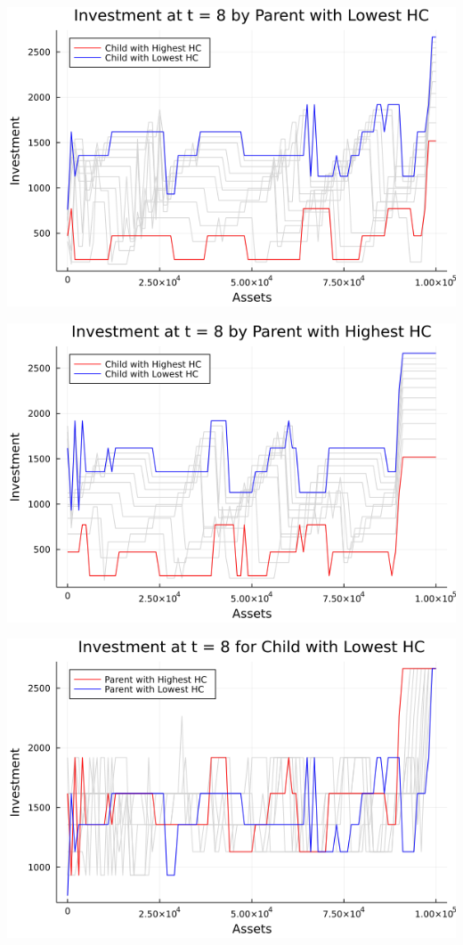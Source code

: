 \documentclass{article}
\begin{document}
\begin{enumerate}
\begin{itemize}
\begin{center}

\includegraphics[scale =0.5]{i_p_l}

\includegraphics[scale =0.5]{i_p_h}

\includegraphics[scale =0.5]{i_c_l}


\end{center}
\end{itemize}
\end{enumerate}
\end{document}
